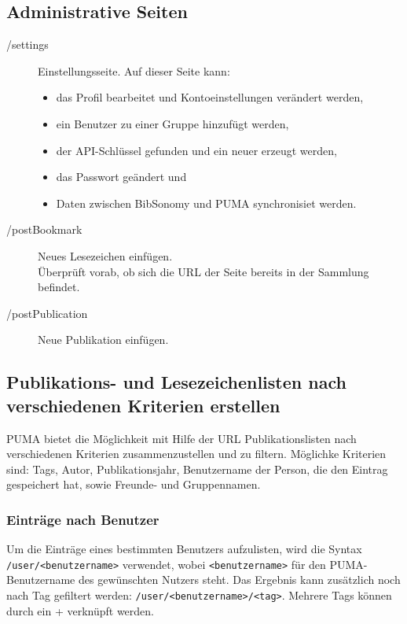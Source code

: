 \subsection{Administrative Seiten}
\label{subsec:adminSeiten}
\begin{description}
\item [/settings]  Einstellungsseite. Auf dieser Seite kann:
    \begin{itemize}
        \item das Profil bearbeitet und Kontoeinstellungen verändert werden,
        \item ein Benutzer zu einer Gruppe hinzufügt werden,
        \item der API-Schlüssel gefunden und ein neuer erzeugt werden,
        \item das Passwort geändert und
        \item Daten zwischen BibSonomy und PUMA synchronisiet werden.
    \end{itemize}
    \item [/postBookmark]    Neues Lesezeichen einfügen. \hfill \\Überprüft vorab, ob sich die URL der Seite bereits in der Sammlung befindet.
    \item [/postPublication]    Neue Publikation einfügen. 
\end{description}

\subsection{Publikations- und Lesezeichenlisten nach verschiedenen Kriterien erstellen}
\label{subsec:suchenMitUrlSyntax}
PUMA bietet die Möglichkeit mit Hilfe der URL Publikationslisten nach verschiedenen Kriterien zusammenzustellen und zu filtern. Möglichke Kriterien sind: Tags, Autor, Publikationsjahr, Benutzername der Person, die den Eintrag gespeichert hat, sowie Freunde- und Gruppennamen. 

\subsubsection*{Einträge nach Benutzer}
\label{sss:nachBenutzer}

Um die Einträge eines bestimmten Benutzers aufzulisten, wird die Syntax \texttt{/user/<benutzername>} verwendet, wobei \texttt{<benutzername>} für den PUMA-Benutzername des gewünschten Nutzers steht. Das Ergebnis kann zusätzlich noch nach Tag gefiltert werden: \texttt{/user/<benutzername>/<tag>}. Mehrere Tags können durch ein + verknüpft werden.

